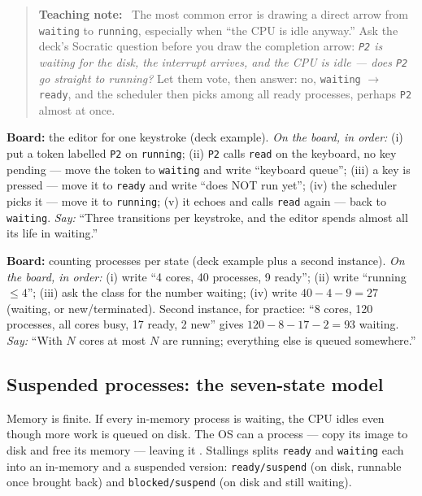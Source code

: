 \documentclass[11pt]{article}
\newenvironment{teachingaside}{\begin{quote}\small\color{primary-gold}\textbf{Teaching note:}\ }{\end{quote}}
\begin{document}
\begin{teachingaside}
The most common error is drawing a direct arrow from \texttt{waiting} to \texttt{running}, especially when ``the CPU is idle anyway.'' Ask the deck's Socratic question before you draw the completion arrow: \emph{\texttt{P2} is waiting for the disk, the interrupt arrives, and the CPU is idle --- does \texttt{P2} go straight to running?} Let them vote, then answer: no, \texttt{waiting} $\to$ \texttt{ready}, and the scheduler then picks among all ready processes, perhaps \texttt{P2} almost at once.
\end{teachingaside}

\textbf{Board:} the editor for one keystroke (deck example). \emph{On the board, in order:} (i) put a token labelled \texttt{P2} on \texttt{running}; (ii) \texttt{P2} calls \texttt{read} on the keyboard, no key pending --- move the token to \texttt{waiting} and write ``keyboard queue''; (iii) a key is pressed --- move it to \texttt{ready} and write ``does NOT run yet''; (iv) the scheduler picks it --- move it to \texttt{running}; (v) it echoes and calls \texttt{read} again --- back to \texttt{waiting}. \emph{Say:} ``Three transitions per keystroke, and the editor spends almost all its life in waiting.''

\textbf{Board:} counting processes per state (deck example plus a second instance). \emph{On the board, in order:} (i) write ``4 cores, 40 processes, 9 ready''; (ii) write ``running $\le 4$''; (iii) ask the class for the number waiting; (iv) write $40 - 4 - 9 = 27$ (waiting, or new/terminated). Second instance, for practice: ``8 cores, 120 processes, all cores busy, 17 ready, 2 new'' gives $120 - 8 - 17 - 2 = 93$ waiting. \emph{Say:} ``With $N$ cores at most $N$ are running; everything else is queued somewhere.''

\subsection*{Suspended processes: the seven-state model}

Memory is finite. If every in-memory process is waiting, the CPU idles even though more work is queued on disk. The OS can  a process --- copy its image to disk and free its memory --- leaving it . Stallings splits \texttt{ready} and \texttt{waiting} each into an in-memory and a suspended version: \texttt{ready/suspend} (on disk, runnable once brought back) and \texttt{blocked/suspend} (on disk and still waiting).
\end{document}
